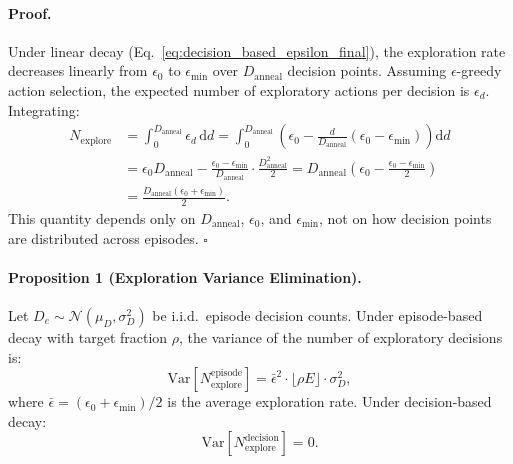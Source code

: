 \paragraph{Proof.}
Under linear decay (Eq.~\ref{eq:decision_based_epsilon_final}), the exploration
rate decreases linearly from $\epsilon_0$ to $\epsilon_{\min}$ over
$D_{\mathrm{anneal}}$ decision points. Assuming $\epsilon$-greedy action selection,
the expected number of exploratory actions per decision is $\epsilon_d$. Integrating:
\begin{align}
N_{\text{explore}}
&= \int_0^{D_{\mathrm{anneal}}} \epsilon_d \, \mathrm{d}d
= \int_0^{D_{\mathrm{anneal}}}
\left(
\epsilon_0 - \frac{d}{D_{\mathrm{anneal}}}(\epsilon_0 - \epsilon_{\min})
\right) \mathrm{d}d
\\
&= \epsilon_0 D_{\mathrm{anneal}}
- \frac{\epsilon_0 - \epsilon_{\min}}{D_{\mathrm{anneal}}}
\cdot \frac{D_{\mathrm{anneal}}^2}{2}
= D_{\mathrm{anneal}}
\left(
\epsilon_0 - \frac{\epsilon_0 - \epsilon_{\min}}{2}
\right)
\\
&= \frac{D_{\mathrm{anneal}}(\epsilon_0 + \epsilon_{\min})}{2}.
\end{align}
This quantity depends only on $D_{\mathrm{anneal}}$, $\epsilon_0$, and
$\epsilon_{\min}$, not on how decision points are distributed across episodes. $\square$

\paragraph{Proposition 1 (Exploration Variance Elimination).}
\label{prop:variance_elimination}
Let $D_e \sim \mathcal{N}(\mu_D, \sigma_D^2)$ be i.i.d.\ episode decision counts.
Under episode-based decay with target fraction $\rho$, the variance of the number
of exploratory decisions is:
\begin{equation}
\mathrm{Var}\!\left[N_{\text{explore}}^{\text{episode}}\right]
= \bar{\epsilon}^2 \cdot \lfloor \rho E \rfloor \cdot \sigma_D^2,
\label{eq:variance_episode}
\end{equation}
where $\bar{\epsilon} = (\epsilon_0 + \epsilon_{\min})/2$ is the average
exploration rate. Under decision-based decay:
\begin{equation}
\mathrm{Var}\!\left[N_{\text{explore}}^{\text{decision}}\right] = 0.
\label{eq:variance_decision}
\end{equation}

